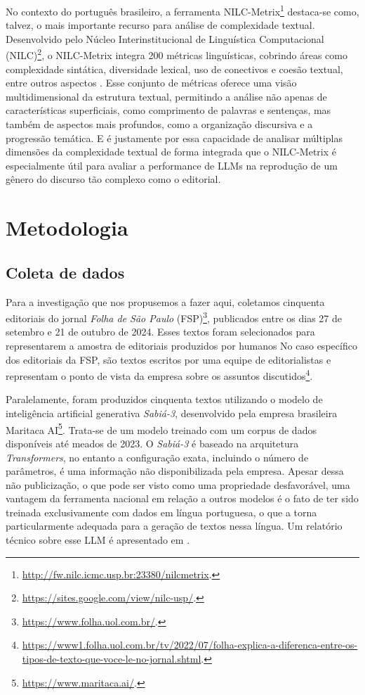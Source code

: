 \documentclass[portuguese]{textolivre}
\begin{document}
No contexto do português brasileiro, a ferramenta NILC-Metrix\footnote{\url{http://fw.nilc.icmc.usp.br:23380/nilcmetrix}.} destaca-se como, talvez, o mais importante recurso para análise de complexidade textual.
Desenvolvido pelo Núcleo Interinstitucional de Linguística Computacional (NILC)\footnote{\url{https://sites.google.com/view/nilc-usp/}.}, o NILC-Metrix integra 200 métricas linguísticas, cobrindo áreas como complexidade sintática, diversidade lexical, uso de conectivos e coesão textual, entre outros aspectos \cite{Leal2024}.
Esse conjunto de métricas oferece uma visão multidimensional da estrutura textual, permitindo a análise não apenas de características superficiais, como comprimento de palavras e sentenças, mas também de aspectos mais profundos, como a organização discursiva e a progressão temática.
E é justamente por essa capacidade de analisar múltiplas dimensões da complexidade textual de forma integrada que o NILC-Metrix é especialmente útil para avaliar a performance de LLMs na reprodução de um gênero do discurso tão complexo como o editorial.

\section{Metodologia}\label{sec-metodologia}

\subsection{Coleta de dados}\label{sec-coleta}
Para a investigação que nos propusemos a fazer aqui, coletamos cinquenta editoriais do jornal \emph{Folha de São Paulo} (FSP)\footnote{\url{https://www.folha.uol.com.br/}.}, publicados entre os dias 27 de setembro e 21 de outubro de 2024.
Esses textos foram selecionados para representarem a amostra de editoriais produzidos por humanos
No caso específico dos editoriais da FSP, são textos escritos por uma equipe de editorialistas e representam o ponto de vista da empresa sobre os assuntos discutidos\footnote{\url{https://www1.folha.uol.com.br/tv/2022/07/folha-explica-a-diferenca-entre-os-tipos-de-texto-que-voce-le-no-jornal.shtml}.}.

Paralelamente, foram produzidos cinquenta textos utilizando o modelo de inteligência artificial generativa \emph{Sabiá-3}, desenvolvido pela empresa brasileira Maritaca AI\footnote{\url{https://www.maritaca.ai/}.}.
Trata-se de um modelo treinado com um corpus de dados disponíveis até meados de 2023.
O \emph{Sabiá-3} é baseado na arquitetura \emph{Transformers}, no entanto a configuração exata, incluindo o número de parâmetros, é uma informação não disponibilizada pela empresa.
Apesar dessa não publicização, o que pode ser visto como uma propriedade desfavorável, uma vantagem da ferramenta nacional em relação a outros modelos é o fato de ter sido treinada exclusivamente com dados em língua portuguesa, o que a torna particularmente adequada para a geração de textos nessa língua.
Um relatório técnico sobre esse LLM é apresentado em \textcite{Abonizio2025}.
\end{document}

